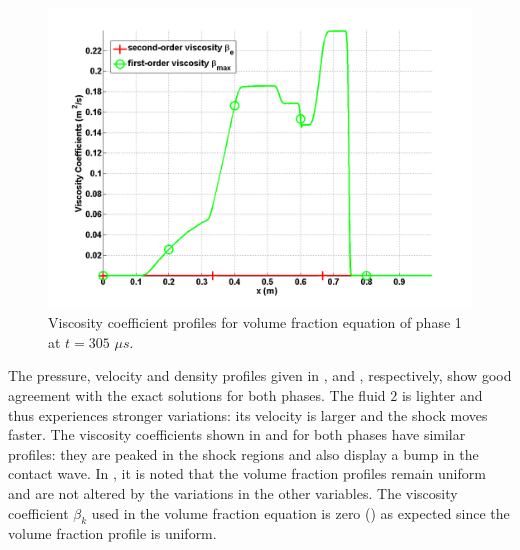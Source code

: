 \begin{figure}[H]
\centering
\includegraphics[width=\textwidth]{figures/SEM/two_phases_liquid_beta.png}
\caption{Viscosity coefficient profiles for volume fraction equation of phase 1 at $t=305$ $\mu s$.}
\label{fig:two-indep-fluids-vf-visc-1-7-eqn-sect4}
\end{figure}
%
The pressure, velocity and density profiles given in ,  and , respectively, show good agreement with the exact solutions for both phases. The fluid $2$ is lighter and thus experiences stronger variations: its velocity is larger and the shock moves faster. The viscosity coefficients shown in  and  for both phases have similar profiles: they are peaked in the shock regions and also display a bump in the contact wave. In , it is noted that the volume fraction profiles remain uniform and are not altered by the variations in the other variables. The viscosity coefficient $\beta_k$ used in the volume fraction equation is zero () as expected since the volume fraction profile is uniform.
